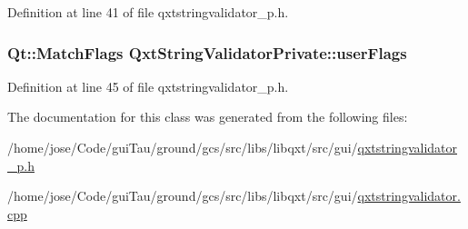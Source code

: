 Definition at line 41 of file qxtstringvalidator\-\_\-p.\-h.

\hypertarget{class_qxt_string_validator_private_acf58ad5e7a789b0cb8ab5acfaaf5b18a}{
\subsubsection[{user\-Flags}]{\setlength{\rightskip}{0pt plus 5cm}Qt\-::\-Match\-Flags Qxt\-String\-Validator\-Private\-::user\-Flags}}\label{class_qxt_string_validator_private_acf58ad5e7a789b0cb8ab5acfaaf5b18a}


Definition at line 45 of file qxtstringvalidator\-\_\-p.\-h.



The documentation for this class was generated from the following files\-:\begin{DoxyCompactItemize}
\item 
/home/jose/\-Code/gui\-Tau/ground/gcs/src/libs/libqxt/src/gui/\hyperlink{qxtstringvalidator__p_8h}{qxtstringvalidator\-\_\-p.\-h}\item 
/home/jose/\-Code/gui\-Tau/ground/gcs/src/libs/libqxt/src/gui/\hyperlink{qxtstringvalidator_8cpp}{qxtstringvalidator.\-cpp}\end{DoxyCompactItemize}
